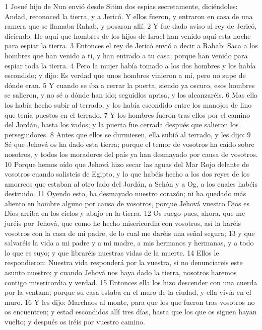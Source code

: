 1 Josué hijo de Nun envió desde Sitim dos espías secretamente, diciéndoles: Andad, reconoced la tierra, y a Jericó. Y ellos fueron, y entraron en casa de una ramera que se llamaba Rahab, y posaron allí.
2 Y fue dado aviso al rey de Jericó, diciendo: He aquí que hombres de los hijos de Israel han venido aquí esta noche para espiar la tierra.
3 Entonces el rey de Jericó envió a decir a Rahab: Saca a los hombres que han venido a ti, y han entrado a tu casa; porque han venido para espiar toda la tierra.
4 Pero la mujer había tomado a los dos hombres y los había escondido; y dijo: Es verdad que unos hombres vinieron a mí, pero no supe de dónde eran.
5 Y cuando se iba a cerrar la puerta, siendo ya oscuro, esos hombres se salieron, y no sé a dónde han ido; seguidlos aprisa, y los alcanzaréis.
6 Mas ella los había hecho subir al terrado, y los había escondido entre los manojos de lino que tenía puestos en el terrado.
7 Y los hombres fueron tras ellos por el camino del Jordán, hasta los vados; y la puerta fue cerrada después que salieron los perseguidores.
8 Antes que ellos se durmiesen, ella subió al terrado, y les dijo:
9 Sé que Jehová os ha dado esta tierra; porque el temor de vosotros ha caído sobre nosotros, y todos los moradores del país ya han desmayado por causa de vosotros.
10 Porque hemos oído que Jehová hizo secar las aguas del Mar Rojo delante de vosotros cuando salisteis de Egipto, y lo que habéis hecho a los dos reyes de los amorreos que estaban al otro lado del Jordán, a Sehón y a Og, a los cuales habéis destruido. 
11 Oyendo esto, ha desmayado nuestro corazón; ni ha quedado más aliento en hombre alguno por causa de vosotros, porque Jehová vuestro Dios es Dios arriba en los cielos y abajo en la tierra.
12 Os ruego pues, ahora, que me juréis por Jehová, que como he hecho misericordia con vosotros, así la haréis vosotros con la casa de mi padre, de lo cual me daréis una señal segura;
13 y que salvaréis la vida a mi padre y a mi madre, a mis hermanos y hermanas, y a todo lo que es suyo; y que libraréis nuestras vidas de la muerte.
14 Ellos le respondieron: Nuestra vida responderá por la vuestra, si no denunciareis este asunto nuestro; y cuando Jehová nos haya dado la tierra, nosotros haremos contigo misericordia y verdad.
15 Entonces ella los hizo descender con una cuerda por la ventana; porque su casa estaba en el muro de la ciudad, y ella vivía en el muro.
16 Y les dijo: Marchaos al monte, para que los que fueron tras vosotros no os encuentren; y estad escondidos allí tres días, hasta que los que os siguen hayan vuelto; y después os iréis por vuestro camino.

